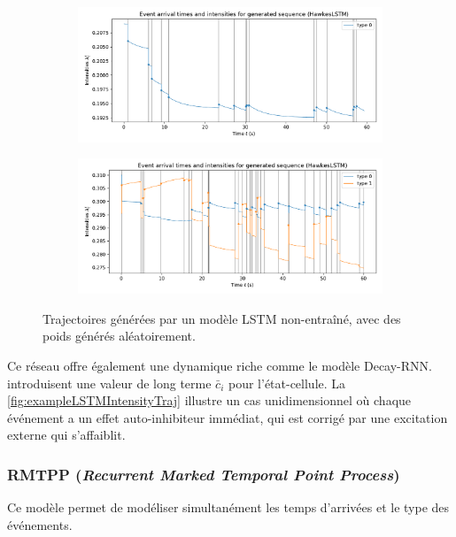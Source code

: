 \documentclass[../main.tex]{subfiles}
\begin{document}
\begin{figure}[!h]
	\begin{subfigure}{\linewidth}
		\includegraphics[width=\linewidth]{../notebooks/example_lstmplot.pdf}
	\end{subfigure}
	\begin{subfigure}{\linewidth}
		\includegraphics[width=\linewidth]{../notebooks/example_lstmplot2d.pdf}
	\end{subfigure}
	\caption{Trajectoires générées par un modèle LSTM non-entraîné, avec des poids générés aléatoirement.}\label{fig:exampleLSTMIntensityTraj}
\end{figure}

Ce réseau offre également une dynamique riche comme le modèle Decay-RNN. \citeauthor{meiEisnerNeuralHawkes} introduisent une valeur de long terme $\bar{c}_i$ pour l'état-cellule. La \autoref{fig:exampleLSTMIntensityTraj} illustre un cas unidimensionnel où chaque événement a un effet auto-inhibiteur immédiat, qui est corrigé par une excitation externe qui s'affaiblit.

\subsubsection{RMTPP (\textit{Recurrent Marked Temporal Point Process})}

Ce modèle permet de modéliser simultanément les temps d'arrivées et le type des événements.  
\end{document}
